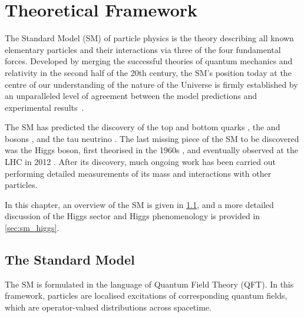 \chapter{Theoretical Framework}\label{chap:theory}

The Standard Model (SM) of particle physics is the theory describing all known elementary particles and their interactions via three of the four fundamental forces.
Developed by merging the successful theories of quantum mechanics and relativity in the second half of the 20th century, the SM's position today at the centre of our understanding of the nature of the Universe is firmly established by an unparalleled level of agreement between the model predictions and experimental results~\cite{morel2020determination,sailer2022measurement}.

The SM has predicted the discovery of the top and bottom quarks \cite{CDF:1995wbb,D0:1995jca,Herb:1977ek}, the \Wboson and \Zboson bosons \cite{UA1:1983crd}, and the tau neutrino \cite{DONUT:2000fbd}.
The last missing piece of the SM to be discovered was the Higgs boson, first theorised in the 1960s \cite{Englert:1964et,Higgs:1964pj,Guralnik:1964eu}, and eventually observed at the LHC in 2012 \cite{HIGG-2012-27,CMS-HIG-12-028}.
After its discovery, much ongoing work has been carried out performing detailed measurements of its mass and interactions with other particles.

In this chapter, an overview of the SM is given in \cref{sec:standard_model}, and a more detailed discussion of the Higgs sector and Higgs phenomenology is provided in \cref{sec:sm_higgs}.

\section{The Standard Model}\label{sec:standard_model}

The SM is formulated in the language of Quantum Field Theory (QFT).
In this framework, particles are localised excitations of corresponding quantum fields, which are operator-valued distributions across spacetime.

